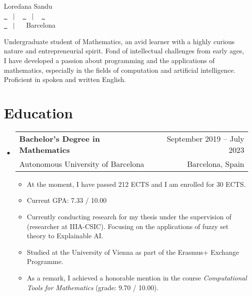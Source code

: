 \documentclass[a4paper,11pt]{article}
\makeatletter
\newcommand{\resumeQuadHeading}[4]{
  \item
  \begin{tabular*}{0.96\textwidth}[t]{l@{\extracolsep{\fill}}r}
    \textbf{#1} & \small #2 \\
    \small#3 & \small #4 \\
  \end{tabular*}
}
\newcommand{\resumeHeadingListStart}{
  \begin{itemize}[leftmargin=0.15in, label={}]
}
\newcommand{\resumeHeadingListEnd}{\end{itemize}}
\makeatother
\begin{document}
\begin{center}
    {\Huge Loredana Sandu \vspace{2pt}} \\[1.25pc]
    \href{https://loredanasandu.com}{\faLink \ } \ $|$ \ %
    \href{https://www.linkedin.com/in/loredana-sandu/}{\faLinkedinSquare \ } \ $|$ \ %
    \href{https://www.github.com/loredanasandu}{\faGithub \ } \\[0.1pc] %
    \href{mailto:loredana@loredanasandu.com}{\faEnvelope \ } \ $|$ \ %
    \faHome \ Barcelona \\[1.5pc] %
\end{center}

\begin{justify}
    Undergraduate student of Mathematics, an avid learner with a highly curious nature and entrepreneurial spirit. Fond of intellectual challenges from early ages, I have developed a passion about programming and the applications of mathematics, especially in the fields of computation and artificial intelligence. Proficient in spoken and written English.
\end{justify}



\section{Education}
    \resumeHeadingListStart{}
      \resumeQuadHeading{Bachelor's Degree in Mathematics}{September 2019 – July 2023}
      {Autonomous University of Barcelona}{Barcelona, Spain}
      \begin{itemize}[leftmargin=3em, itemsep=0.1em, topsep=2pt]
          \item \small At the moment, I have passed 212 ECTS and I am enrolled for 30 ECTS.
          \item \small Current GPA: 7.33 / 10.00
          \item \small Currently conducting research for my thesis under the supervision of \href{https://www.iiia.csic.es/es/people/person/?person_id=35}{} (researcher at IIIA-CSIC). Focusing on the applications of fuzzy set theory to Explainable AI.
          \item \small Studied at the University of Vienna as part of the Erasmus+ Exchange Programme.
          \item \small As a remark, I achieved a honorable mention in the course \textit{Computational Tools for Mathematics} (grade: 9.70 / 10.00). 
      \end{itemize}
    \resumeHeadingListEnd{}
\end{document}
